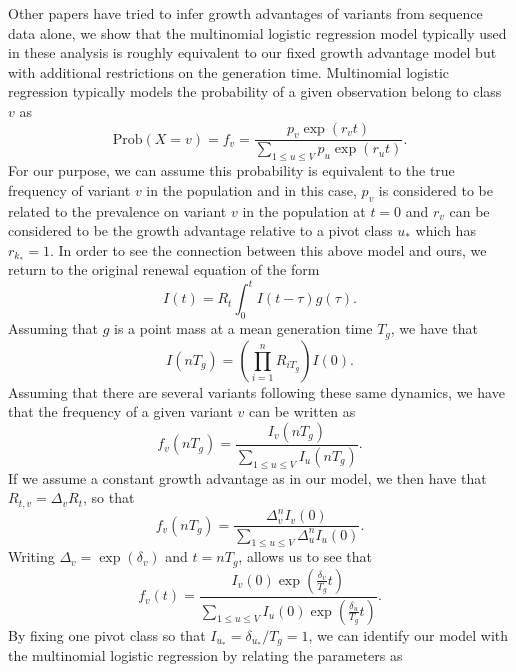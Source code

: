 \documentclass[11pt,oneside,letterpaper]{article}
\begin{document}
Other papers have tried to infer growth advantages of variants from sequence data alone, we show that the multinomial logistic regression model typically used in these analysis is roughly equivalent to our fixed growth advantage model but with additional restrictions on the generation time.
Multinomial logistic regression typically models the probability of a given observation belong to class $v$ as
\begin{equation}
  \text{Prob}(X = v) = f_{v} = \frac{p_{v}\exp(r_{v} t)}{\sum_{1\leq u\leq V} p_{u}\exp(r_{u} t)}.
\end{equation}
For our purpose, we can assume this probability is equivalent to the true frequency of variant $v$ in the population and in this case, $p_{v}$ is considered to be related to the prevalence on variant $v$ in the population at $t=0$ and $r_{v}$ can be considered to be the growth advantage relative to a pivot class $u_{*}$ which has $r_{k_{*}} = 1$.
In order to see the connection between this above model and ours, we return to the original renewal equation of the form
\begin{equation}
  I(t) = R_{t}\int_{0}^{t} I(t-\tau) g(\tau).
\end{equation}
Assuming that $g$  is a point mass at a mean generation time $T_{g}$, we have that
\begin{equation}
  I(nT_{g}) = \left(\prod_{i=1}^{n} R_{iT_{g}}\right) I(0).
\end{equation}
Assuming that there are several variants following these same dynamics, we have that the frequency of a given variant $v$ can be written as
\begin{equation}
  f_{v}(nT_{g}) = \frac{I_{v}(nT_{g})}{\sum_{1\leq u \leq V} I_{u}(nT_{g})}.
\end{equation}
If we assume a constant growth advantage as in our model, we then have that $R_{t,v} = \Delta_{v} R_{t}$, so that
\begin{equation}
  f_{v}(nT_{g}) =  \frac{\Delta_{v}^{n} I_{v}(0)}{\sum_{1\leq u \leq V} \Delta_{u}^{n} I_{u}(0)}.
\end{equation}
Writing $\Delta_{v} = \exp(\delta_{v})$ and $t = n T_{g}$, allows us to see that
\begin{equation}
  f_{v}(t) = \frac{I_{v}(0) \exp(\frac{\delta_{v}}{T_{g}} t)}{\sum_{1\leq u \leq V}I_{u}(0) \exp(\frac{\delta_{u}}{T_{g}} t)}.
\end{equation}
By fixing one pivot class so that $I_{u_{*}} = \delta_{u_{*}} / T_{g} = 1$, we can identify our model with the multinomial logistic regression by relating the parameters as
\end{document}
